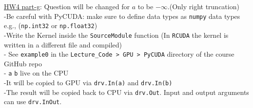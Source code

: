 \documentclass[a4paper, 11pt]{report}
\begin{document}
\underline{HW4 part-g}: Question will be changed for $a$ to be $-\infty$.(Only right truncation)\\
-Be careful with PyCUDA: make sure to define data types as \texttt{numpy} data types e.g., (\texttt{np.int32} or \texttt{np.float32})\\
-Write the Kernel inside the \texttt{SourceModule} function (In \texttt{RCUDA} the kernel is written in a different file and compiled)\\
- See \texttt{example0} in the \texttt{Lecture\_Code > GPU > PyCUDA} directory of the course GitHub repo\\
- \texttt{a} \texttt{b} live on the CPU\\
-It will be copied to GPU via \texttt{drv.In(a)}  and \texttt{drv.In(b)}\\
-The result will be copied back to CPU via \texttt{drv.Out}. Input and output arguments can use \texttt{drv.InOut}.
\end{document}

